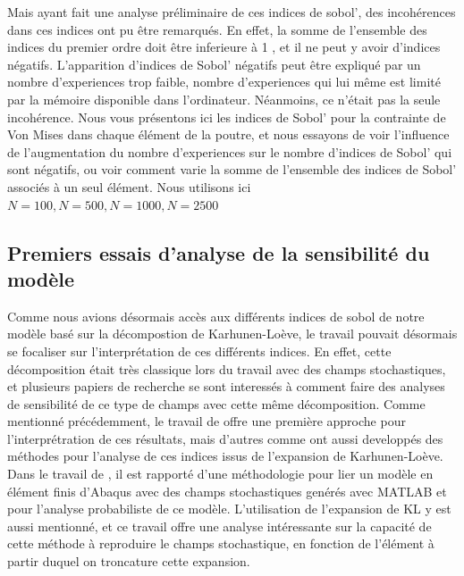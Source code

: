 \documentclass[a4paper,10pt]{article}
\begin{document}
Mais ayant fait une analyse préliminaire de ces indices de sobol', des incohérences dans ces indices ont pu être remarqués. En effet, la somme de l'ensemble des indices du premier ordre doit être inferieure à 1 , et il ne peut y avoir d'indices négatifs. L'apparition d'indices de Sobol' négatifs peut être expliqué par un nombre d'experiences trop faible, nombre d'experiences qui lui même est limité par la mémoire disponible dans l'ordinateur. Néanmoins, ce n'était pas la seule incohérence. Nous vous présentons ici les indices de Sobol' pour la contrainte de Von Mises dans chaque élément de la poutre, et nous essayons de voir l'influence de l'augmentation du nombre d'experiences sur le nombre d'indices de Sobol' qui sont négatifs, ou voir comment varie la somme de l'ensemble des indices de Sobol' associés à un seul élément. Nous utilisons ici $N=100 , N=500, N=1000, N=2500$



\subsection{Premiers essais d'analyse de la sensibilité du modèle }

Comme nous avions désormais accès aux différents indices de sobol de notre modèle basé sur la décompostion de Karhunen-Loève, le travail pouvait désormais se focaliser sur l'interprétation de ces différents indices. En effet, cette décomposition était très classique lors du travail avec des champs stochastiques, et plusieurs papiers de recherche se sont interessés à comment faire des  analyses de sensibilité de ce type de champs avec cette même décomposition. Comme mentionné précédemment, le travail de \cite{Wei2017May} offre une première approche pour l'interprétration de ces résultats, mais d'autres comme \cite{Pronzato2019Jul} ont aussi developpés des méthodes pour l'analyse de ces indices issus de l'expansion de Karhunen-Loève. 
Dans le travail de \cite{shangStochastic2013}, il est rapporté d'une méthodologie pour lier un modèle en élément finis d'Abaqus avec des champs stochastiques genérés avec MATLAB et pour l'analyse probabiliste de ce modèle. L'utilisation de l'expansion de KL y est aussi mentionné, et ce travail offre une analyse intéressante sur la capacité de cette méthode à reproduire le champs stochastique, en fonction de l'élément à partir duquel on troncature cette expansion. 
\end{document}
